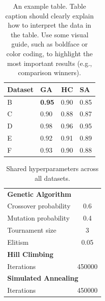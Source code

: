\begin{table}
\centering\footnotesize\sf
\begin{tabular}{llrl}
\toprule
Dataset & GA & HC & SA \\
\midrule
B & \textbf{0.95} & 0.90 & 0.85 \\
C & 0.90 & 0.88 & 0.87 \\
D & 0.98 & 0.96 & 0.95 \\
E & 0.92 & 0.91 & 0.89 \\
F & 0.93 & 0.90 & 0.88 \\
\bottomrule
\end{tabular}
\caption{An example table.  Table caption should clearly explain how to interpret the data in the table. Use some visual guide, such as boldface or color coding, to highlight the most important results (e.g., comparison winners).}
\label{tab:results}
\end{table}

\begin{table}[h]
\centering\footnotesize\sf

\begin{tabular}{l@{}c}
\multicolumn{2}{l}{\textbf{Genetic Algorithm}} \\
Crossover probability & 0.6 \\
Mutation probability & 0.4 \\
Tournament size & 3 \\
Elitism & 0.05 \\
\midrule
\multicolumn{2}{l}{\textbf{Hill Climbing}} \\
Iterations & 450000 \\
\midrule
\multicolumn{2}{l}{\textbf{Simulated Annealing}} \\
Iterations & 450000 \\
\end{tabular}

\caption[Shared hyperparameters]{Shared hyperparameters across all datasets.}
\label{tab:hyperparams_shared}
\end{table}

